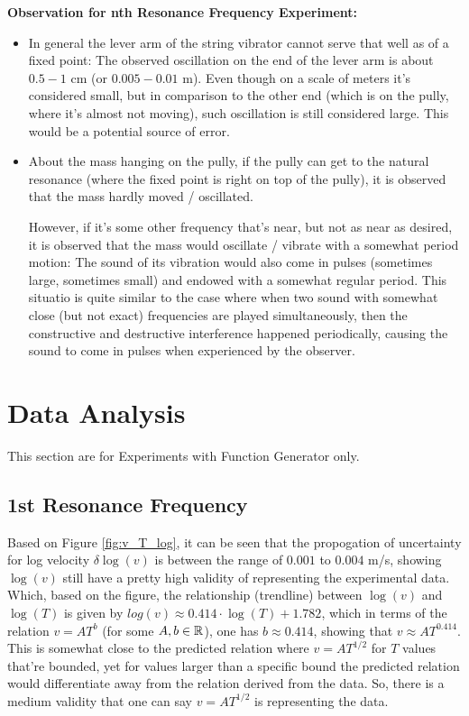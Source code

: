 \documentclass{article}
\begin{document}
\textbf{Observation for nth Resonance Frequency Experiment:} 
\begin{itemize}
    \item In general the lever arm of the string vibrator cannot serve that well as of a fixed point: The observed oscillation on the end of the lever arm is about $0.5-1$ cm (or $0.005-0.01$ m). Even though on a scale of meters it's considered small, but in comparison to the other end (which is on the pully, where it's almost not moving), such oscillation is still considered large. This would be a potential source of error.
    \item About the mass hanging on the pully, if the pully can get to the natural resonance (where the fixed point is right on top of the pully), it is observed that the mass hardly moved / oscillated. 
    
    However, if it's some other frequency that's near, but not as near as desired, it is observed that the mass would oscillate / vibrate with a somewhat period motion: The sound of its vibration would also come in pulses (sometimes large, sometimes small) and endowed with a somewhat regular period. This situatio is quite similar to the case where when two sound with somewhat close (but not exact) frequencies are played simultaneously, then the constructive and destructive interference happened periodically, causing the sound to come in pulses when experienced by the observer.
\end{itemize}

\newpage

\section{Data Analysis}
This section are for Experiments with Function Generator only.
\subsection{1st Resonance Frequency}
Based on Figure \ref{fig:v_T_log}, it can be seen that the propogation of uncertainty for log velocity $\delta \log(v)$ is between the range of $0.001$ to $0.004$ m/s, showing $\log(v)$ still have a pretty high validity of representing the experimental data. Which, based on the figure, the relationship (trendline) between $\log(v)$ and $\log(T)$ is given by $log(v)\approx 0.414 \cdot \log(T) + 1.782$, which in terms of the relation $v = A T^b$ (for some $A,b \in\mathbb{R}$), one has $b \approx 0.414$, showing that $v \approx A T^{0.414}$. This is somewhat close to the predicted relation where $v = A T^{1/2}$ for $T$ values that're bounded, yet for values larger than a specific bound the predicted relation would differentiate away from the relation derived from the data. So, there is a medium validity that one can say $v = A T^{1/2}$ is representing the data.
\end{document}
